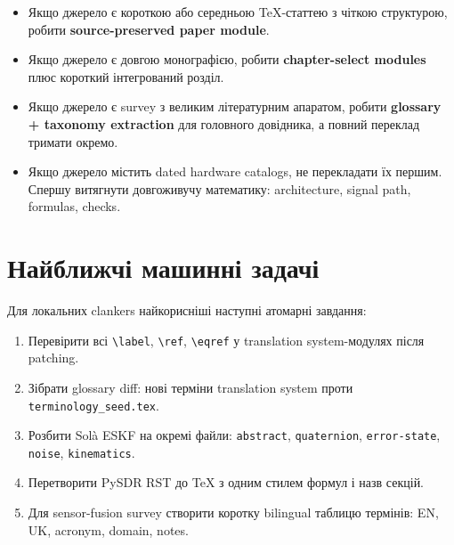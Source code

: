 \begin{itemize}
\item Якщо джерело є короткою або середньою TeX-статтею з чіткою структурою, робити \textbf{source-preserved paper module}.
\item Якщо джерело є довгою монографією, робити \textbf{chapter-select modules} плюс короткий інтегрований розділ.
\item Якщо джерело є survey з великим літературним апаратом, робити \textbf{glossary + taxonomy extraction} для головного довідника, а повний переклад тримати окремо.
\item Якщо джерело містить dated hardware catalogs, не перекладати їх першим. Спершу витягнути довгоживучу математику: architecture, signal path, formulas, checks.
\end{itemize}

\section{Найближчі машинні задачі}

Для локальних clankers найкорисніші наступні атомарні завдання:

\begin{enumerate}[label=\arabic*.]
\item Перевірити всі \verb|\label|, \verb|\ref|, \verb|\eqref| у translation system-модулях після patching.
\item Зібрати glossary diff: нові терміни translation system проти \texttt{terminology\_seed.tex}.
\item Розбити Solà ESKF на окремі файли: \texttt{abstract}, \texttt{quaternion}, \texttt{error-state}, \texttt{noise}, \texttt{kinematics}.
\item Перетворити PySDR RST до TeX з одним стилем формул і назв секцій.
\item Для sensor-fusion survey створити коротку bilingual таблицю термінів: EN, UK, acronym, domain, notes.
\end{enumerate}
